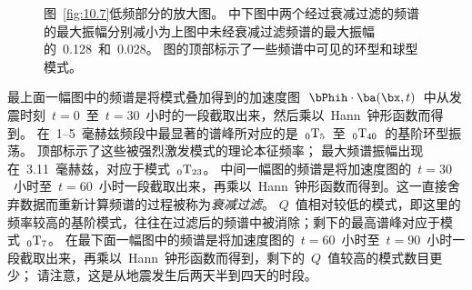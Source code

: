\begin{figure}
\begin{center}
\end{center}
\caption[Bolivia zoom1]{
\label{fig:10.8}
图~\protect\ref{fig:10.7}低频部分的放大图。
中下图中两个经过衰减过滤的频谱的最大振幅分别减小为上图中未经衰减过滤频谱的最大振幅的~0.128~和~0.028。
图的顶部标示了一些频谱中可见的环型和球型模式。}
\end{figure}
最上面一幅图中的频谱是将模式叠加得到的加速度图~$\bPhih\cdot\ba(\bx,t)$~中从发震时刻~$t=0$~至~$t=30$~小时的一段截取出来，然后乘以~Hann~钟形函数而得到。
在~1--5~毫赫兹频段中最显著的谱峰所对应的是~${}_0{\rm T}_5$~至~${}_0{\rm T}_{40}$~的基阶环型振荡。
顶部标示了这些被强烈激发模式的理论本征频率；
最大频谱振幅出现在~3.11~毫赫兹，对应于模式~${}_0{\rm T}_{23}$。
中间一幅图的频谱是将加速度图的~$t=30$~小时至~$t=60$~小时一段截取出来，再乘以~Hann~钟形函数而得到。这一直接舍弃数据而重新计算频谱的过程被称为{\em 衰减过滤\/}。
%
$Q$~值相对较低的模式，即这里的频率较高的基阶模式，往往在过滤后的频谱中被消除；剩下的最高谱峰对应于模式~${}_0{\rm T}_7$。
在最下面一幅图中的频谱是将加速度图的~$t=60$~小时至~$t=90$~小时一段截取出来，再乘以~Hann~钟形函数而得到，剩下的~$Q$~值较高的模式数目更少；
请注意，这是从地震发生后两天半到四天的时段。

